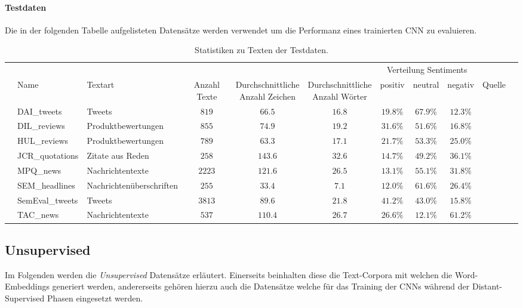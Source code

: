 \paragraph{Testdaten} Die in der folgenden Tabelle aufgelisteten Datensätze werden verwendet um die Performanz eines trainierten \gls{CNN} zu evaluieren.
\begin{table}[H]
	\begin{adjustbox}{max width=\textwidth}
		\begin{tabular}{@{}lllcccccccl@{}}
			\toprule
			& & & & & & \multicolumn{3}{c}{Verteilung Sentiments} &\\
			\cmidrule(r){7-9}
			& Name & Textart & Anzahl Texte & \specialcell{Durchschnittliche\\Anzahl Zeichen} & \specialcell{Durchschnittliche\\Anzahl Wörter} & positiv & neutral & negativ & Quelle &\\ \midrule
			& DAI{\_}tweets & Tweets & $819$ & $66.5$ & $16.8$ & $19.8\%$ & $67.9\%$ & $12.3\%$ & \cite{Narr:2012}\\
			& DIL{\_}reviews & Produktbewertungen & $855$ & $74.9$ & $19.2$ & $31.6\%$ & $51.6\%$ & $16.8\%$ & \cite{Ding:2008}\\
			& HUL{\_}reviews & Produktbewertungen & $789$ & $63.3$ & $17.1$ & $21.7\%$ & $53.3\%$ & $25.0\%$ & \cite{Hu:2004}\\
			& JCR{\_}quotations & Zitate aus Reden & $258$ & $143.6$ & $32.6$ & $14.7\%$ & $49.2\%$ & $36.1\%$ & \cite{Balahur:2013}\\
			& MPQ{\_}news & Nachrichtentexte & $2223$ & $121.6$ & $26.5$ & $13.1\%$ & $55.1\%$ & $31.8\%$ & \cite{Wiebe:2005}\\
			& SEM{\_}headlines & Nachrichtenüberschriften & $255$ & $33.4$ & $7.1$ & $12.0\%$ & $61.6\%$ & $26.4\%$ & \cite{Strapparava:2007}\\
			& SemEval{\_}tweets & Tweets & $3813$ & $89.6$ & $21.8$ & $41.2\%$ & $43.0\%$ & $15.8\%$ & \cite{SemEval:2016:task4}\\
			& TAC{\_}news & Nachrichtentexte & $537$ & $110.4$ & $26.7$ & $26.6\%$ & $12.1\%$ & $61.2\%$ & \cite{Tackstrom:2011}\\
			\bottomrule
		\end{tabular}
	\end{adjustbox}
	\caption{Statistiken zu Texten der Testdaten.}
\end{table}

\clearpage

\subsection{Unsupervised}
Im Folgenden werden die \emph{Unsupervised} Datensätze erläutert. Einerseits beinhalten diese die Text-Corpora mit welchen die Word-Embeddings generiert werden, andererseits gehören hierzu auch die Datensätze welche für das Training der \gls{CNN}s während der Distant-Supervised Phasen eingesetzt werden.

